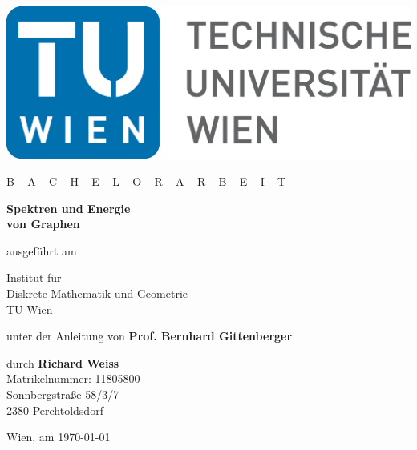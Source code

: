 
\begin{titlepage}

    \begin{center}

        \includegraphics[width = 0.45 \textwidth]{TULogo.eps}

        \vskip 1cm

        {\LARGE B ~ \Large A ~ C ~ H ~ E ~ L ~ O ~ R ~ A ~ R ~ B ~ E ~ I ~ T}

        \vskip 8mm

        {\huge \bfseries Spektren und Energie \\ [1ex] von Graphen}

        \vskip 1cm

        \large  ausgeführt am        

        \vskip 0.75cm

        {\Large Institut für \\ [1ex] Diskrete Mathematik und Geometrie} \\ [1ex]
        {\Large TU Wien}

        \vskip 0.75cm

        unter der Anleitung von
        \vskip 0.75cm
        {\Large \bfseries Prof. Bernhard Gittenberger} \\ [1ex]

        \vskip 0.5cm

        durch
        \vskip 0.5cm
        {\Large \bfseries  Richard Weiss} \\ [1ex]

        Matrikelnummer: 11805800 \\ [1ex]
        Sonnbergstraße 58/3/7 \\ [1ex]
        2380 Perchtoldsdorf

    \end{center}
    
    \vfill
    
    \small
    Wien, am \today
    \vspace*{-15mm}

\end{titlepage}

\cleardoublepage